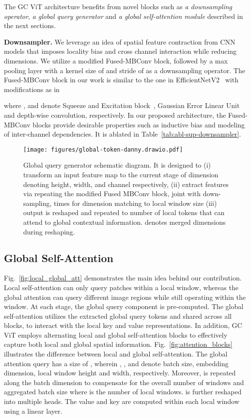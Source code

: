 \documentclass{article}
\theoremstyle{plain}
\theoremstyle{definition}
\theoremstyle{remark}
\begin{document}
The GC ViT architecture benefits from novel blocks such as \textit{a downsampling operator}, \textit{a global query generator} and \textit{a global self-attention module} described in the next sections. 


\textbf{Downsampler.} We leverage an idea of spatial feature contraction from CNN models that imposes locality bias and cross channel interaction while reducing dimensions.  We utilize a modified Fused-MBConv block, followed by a max pooling layer with a kernel size of  and stride of  as a downsampling operator. The Fused-MBConv block in our work is similar to the one in EfficientNetV2~\citep{tan2021efficientnetv2} with modifications as in

where ,  and  denote Squeeze and Excitation block~\citep{hu2018squeeze}, Gaussian Error Linear Unit~\citep{hendrycks2016gaussian} and  depth-wise convolution, respectively. In our proposed architecture, the Fused-MBConv blocks provide desirable properties such as inductive bias and modeling of inter-channel dependencies.  It is ablated in Table~\ref{tab:abl-sup-downsampler}.

\begin{figure*}[t!]
\centering \texttt{[image: figures/global-token-danny.drawio.pdf]}
  \caption{
Global query generator schematic diagram. It is designed to (i) transform an input feature map to the current stage of dimension  denoting height, width, and channel respectively, (ii) extract features via repeating the modified Fused MBConv block, joint with down-sampling,  times for dimension matching to local window size  (iii) output is reshaped and repeated to  number of local tokens that can attend to global contextual information.  denotes merged dimensions during reshaping.
  }
  \label{fig:global_query}
\end{figure*}

\subsection{Global Self-Attention}
\label{sec:global_sa}
Fig.~\ref{fig:local_global_att} demonstrates the main idea behind our contribution. Local self-attention can only query patches within a local window, whereas the global attention can query different image regions while still operating within the window. At each stage, the global query component is pre-computed.
The global self-attention utilizes the extracted global query tokens
and shared across all blocks, to interact with the local key and value representations. In addition, GC ViT employs alternating local and global self-attention blocks to effectively capture both local and global spatial information. Fig.~\ref{fig:attention_blocks} illustrates the difference between local and global self-attention. The global attention query  has a size of , wherein , ,  and  denote batch size, embedding dimension, local window height and width, respectively. Moreover,  is repeated along the batch dimension to compensate for the overall number of windows and aggregated batch size  where  is the number of local windows.  is further reshaped into multiple heads. The value and key are computed within each local window using a linear layer.
\end{document}

